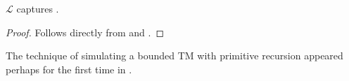 \begin{theorem} \label{thm:l-captures-fptime} $\mathcal{L}$ captures \FPTIME{}.
\end{theorem}

\begin{proof} Follows directly from  and
. \end{proof}




\begin{remark} The technique of simulating a bounded TM with primitive
recursion appeared perhaps for the first time in \cite[.1/176]{minsky-1967}.  \end{remark}








